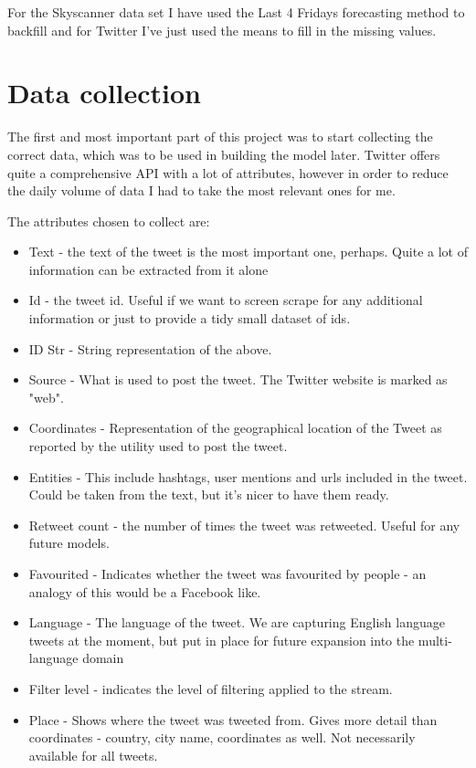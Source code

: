 \documentclass[minf,frontabs,twoside,singlespacing,parskip]{infthesis}
\begin{document}
For the Skyscanner data set I have used the Last 4 Fridays forecasting method to backfill and for Twitter I've just used the means to fill in the missing values. 

\section{Data collection}
\label{sec:dc}

The first and most important part of this project was to start collecting the correct data, which was to be used in building the model later. Twitter offers quite a comprehensive API with a lot of attributes, however in order to reduce the daily volume of data I had to take the most relevant ones for me. 

The attributes chosen to collect are:
\begin{itemize}
\item Text - the text of the tweet is the most important one, perhaps. Quite a lot of information can be extracted from it alone
\item Id - the tweet id. Useful if we want to screen scrape for any additional information or just to provide a tidy small dataset of ids.
\item ID Str - String representation of the above.
\item Source - What is used to post the tweet. The Twitter website is marked as "web".
\item Coordinates  - Representation of the geographical location of the Tweet as reported by the utility used to post the tweet.
\item Entities - This include hashtags, user mentions and urls included in the tweet. Could be taken from the text, but it's nicer to have them ready.
\item Retweet count - the number of times the tweet was retweeted. Useful for any future models. 
\item Favourited - Indicates whether the tweet was favourited by people - an analogy of this would be a Facebook like. 
\item Language - The language of the tweet. We are capturing English language tweets at the moment, but put in place for future expansion into the multi-language domain
\item Filter level - indicates the level of filtering applied to the stream.
\item Place - Shows where the tweet was tweeted from. Gives more detail than coordinates - country, city name, coordinates as well. Not necessarily available for all tweets.
\end{itemize}
\end{document}
